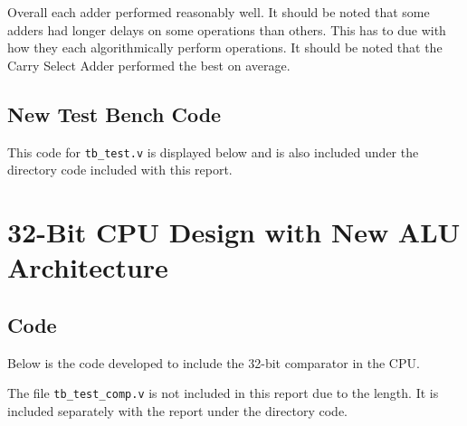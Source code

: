 \documentclass[12pt]{article}
\begin{document}
Overall each adder performed reasonably well. It should be noted that some adders had longer delays on some operations than others. This has to due with how they each algorithmically perform operations. It should be noted that the Carry Select Adder performed the best on average.
\subsection{New Test Bench Code}
This code for \texttt{tb\_test.v} is displayed below and is also included under the directory code included with this report.


\section{32-Bit CPU Design with New ALU Architecture}
\subsection{Code}
Below is the code developed to include the 32-bit comparator in the CPU.



The file \texttt{tb\_test\_comp.v} is not included in this report due to the length. It is included separately with the report under the directory code.
\end{document}
